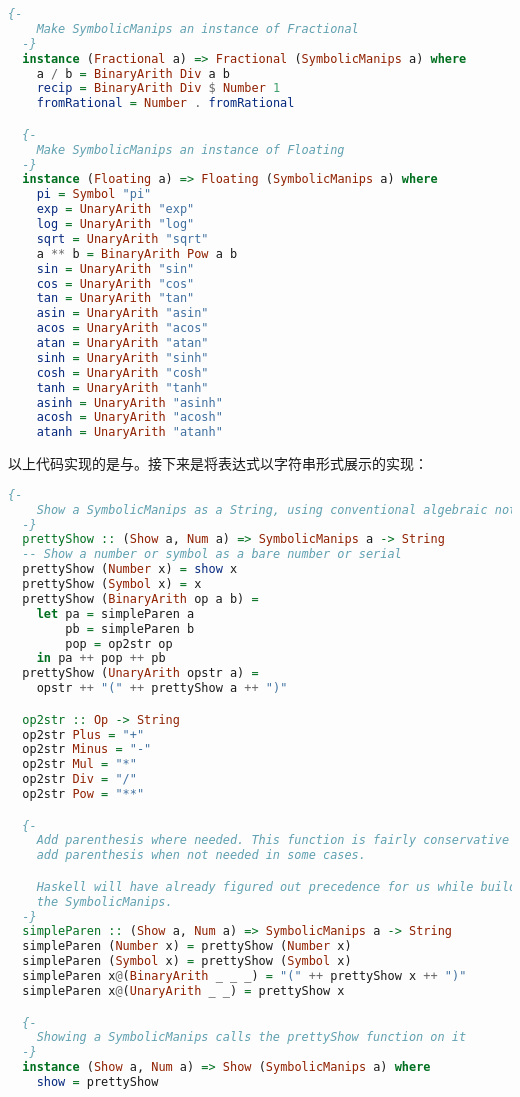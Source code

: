 \documentclass[./main.tex]{subfiles}
\begin{document}
\begin{lstlisting}[language=Haskell]
  {-
    Make SymbolicManips an instance of Fractional
  -}
  instance (Fractional a) => Fractional (SymbolicManips a) where
    a / b = BinaryArith Div a b
    recip = BinaryArith Div $ Number 1
    fromRational = Number . fromRational

  {-
    Make SymbolicManips an instance of Floating
  -}
  instance (Floating a) => Floating (SymbolicManips a) where
    pi = Symbol "pi"
    exp = UnaryArith "exp"
    log = UnaryArith "log"
    sqrt = UnaryArith "sqrt"
    a ** b = BinaryArith Pow a b
    sin = UnaryArith "sin"
    cos = UnaryArith "cos"
    tan = UnaryArith "tan"
    asin = UnaryArith "asin"
    acos = UnaryArith "acos"
    atan = UnaryArith "atan"
    sinh = UnaryArith "sinh"
    cosh = UnaryArith "cosh"
    tanh = UnaryArith "tanh"
    asinh = UnaryArith "asinh"
    acosh = UnaryArith "acosh"
    atanh = UnaryArith "atanh"
\end{lstlisting}

以上代码实现的是与。接下来是将表达式以字符串形式展示的实现：

\begin{lstlisting}[language=Haskell]
  {-
    Show a SymbolicManips as a String, using conventional algebraic notation
  -}
  prettyShow :: (Show a, Num a) => SymbolicManips a -> String
  -- Show a number or symbol as a bare number or serial
  prettyShow (Number x) = show x
  prettyShow (Symbol x) = x
  prettyShow (BinaryArith op a b) =
    let pa = simpleParen a
        pb = simpleParen b
        pop = op2str op
    in pa ++ pop ++ pb
  prettyShow (UnaryArith opstr a) =
    opstr ++ "(" ++ prettyShow a ++ ")"

  op2str :: Op -> String
  op2str Plus = "+"
  op2str Minus = "-"
  op2str Mul = "*"
  op2str Div = "/"
  op2str Pow = "**"

  {-
    Add parenthesis where needed. This function is fairly conservative and will
    add parenthesis when not needed in some cases.

    Haskell will have already figured out precedence for us while building up
    the SymbolicManips.
  -}
  simpleParen :: (Show a, Num a) => SymbolicManips a -> String
  simpleParen (Number x) = prettyShow (Number x)
  simpleParen (Symbol x) = prettyShow (Symbol x)
  simpleParen x@(BinaryArith _ _ _) = "(" ++ prettyShow x ++ ")"
  simpleParen x@(UnaryArith _ _) = prettyShow x

  {-
    Showing a SymbolicManips calls the prettyShow function on it
  -}
  instance (Show a, Num a) => Show (SymbolicManips a) where
    show = prettyShow
\end{lstlisting}
\end{document}
